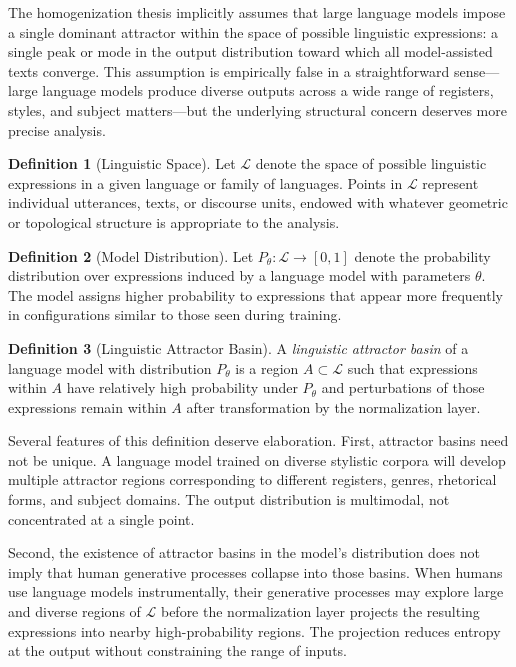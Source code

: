 \documentclass[12pt,a4paper]{article}
\theoremstyle{definition}
\newtheorem{definition}{Definition}[section]
\theoremstyle{plain}
\theoremstyle{remark}
\newcommand{\calL}{\mathcal{L}}
\begin{document}
The homogenization thesis implicitly assumes that large language models impose a single
dominant attractor within the space of possible linguistic expressions: a single peak or mode
in the output distribution toward which all model-assisted texts converge. This assumption is
empirically false in a straightforward sense---large language models produce diverse outputs
across a wide range of registers, styles, and subject matters---but the underlying structural
concern deserves more precise analysis.

\begin{definition}[Linguistic Space]
Let $\calL$ denote the space of possible linguistic expressions in a given language or family
of languages. Points in $\calL$ represent individual utterances, texts, or discourse units,
endowed with whatever geometric or topological structure is appropriate to the analysis.
\end{definition}

\begin{definition}[Model Distribution]
Let $P_\theta : \calL \to [0,1]$ denote the probability distribution over expressions induced
by a language model with parameters $\theta$. The model assigns higher probability to
expressions that appear more frequently in configurations similar to those seen during
training.
\end{definition}

\begin{definition}[Linguistic Attractor Basin]
A \emph{linguistic attractor basin} of a language model with distribution $P_\theta$ is a
region $A \subset \calL$ such that expressions within $A$ have relatively high probability
under $P_\theta$ and perturbations of those expressions remain within $A$ after transformation
by the normalization layer.
\end{definition}

Several features of this definition deserve elaboration. First, attractor basins need not be
unique. A language model trained on diverse stylistic corpora will develop multiple attractor
regions corresponding to different registers, genres, rhetorical forms, and subject domains.
The output distribution is multimodal, not concentrated at a single point.

Second, the existence of attractor basins in the model's distribution does not imply that
human generative processes collapse into those basins. When humans use language models
instrumentally, their generative processes may explore large and diverse regions of $\calL$
before the normalization layer projects the resulting expressions into nearby high-probability
regions. The projection reduces entropy at the output without constraining the range of
inputs.
\end{document}
